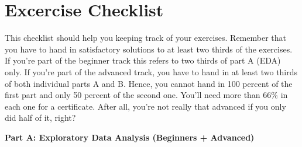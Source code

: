 \documentclass[
  11pt,
]{article}
\begin{document}
\newpage

\hypertarget{excercise-checklist}{%
\section{Excercise Checklist}\label{excercise-checklist}}

This checklist should help you keeping track of your exercises. Remember that you have to hand in satisfactory solutions to at least two thirds of the exercises. If you're part of the beginner track this refers to two thirds of part A (EDA) only. If you're part of the advanced track, you have to hand in at least two thirds of both individual parts A and B. Hence, you cannot hand in 100 percent of the first part and only 50 percent of the second one. You'll need more than 66\% in each one for a certificate. After all, you're not really that advanced if you only did half of it, right?

\textbf{Part A: Exploratory Data Analysis (Beginners + Advanced)}
\end{document}
